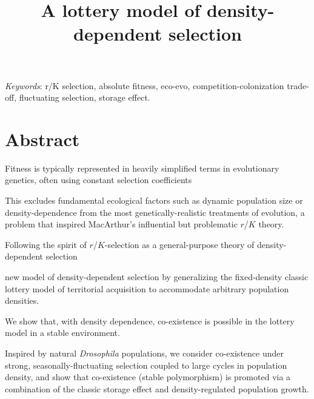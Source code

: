 \documentclass[11pt]{article}
\title{A lottery model of density-dependent selection}
\date{}
\begin{document}
\maketitle




\bigskip


\bigskip

\textit{Keywords}: r/K selection, absolute fitness, eco-evo, competition-colonization trade-off, fluctuating selection, storage effect.

\bigskip


\linenumbers{}
\modulolinenumbers[1]

\newpage{}

\section*{Abstract}

Fitness is typically represented in heavily simplified terms in evolutionary genetics, often using constant selection coefficients

This excludes fundamental ecological factors such as dynamic population size or density-dependence from the most genetically-realistic treatments of evolution, a problem that inspired MacArthur's influential but problematic $r$/$K$ theory. 

Following the spirit of $r$/$K$-selection as a general-purpose theory of density-dependent selection

new model of density-dependent selection by generalizing the fixed-density classic lottery model of territorial acquisition to accommodate arbitrary population densities. 

We show that, with density dependence, co-existence is possible in the lottery model in a stable environment. 

Inspired by natural \textit{Drosophila} populations, we consider co-existence under strong, seasonally-fluctuating selection coupled to large cycles in population density, and show that co-existence (stable polymorphism) is promoted via a combination of the classic storage effect and density-regulated population growth. 

\newpage{}
\end{document}
